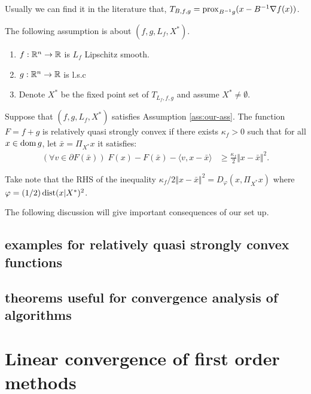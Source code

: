 \documentclass[12pt]{article}
\begin{document}
    \begin{remark}
        Usually we can find it in the literature that, $T_{B, f, g} = \operatorname{prox}_{B^{-1}g}(x - B^{-1}\nabla f(x))$. 
    \end{remark}

    \begin{assumption}\label{ass:our-ass}
        The following assumption is about $(f, g, L_f, X^*)$. 
        \begin{enumerate}
            \item $f: \mathbb R^n \rightarrow \mathbb R$ is $L_f$ Lipschitz smooth. 
            \item $g: \mathbb R^n \rightarrow \mathbb R$ is l.s.c
            \item Denote $X^*$ be the fixed point set of $T_{L_f, f, g}$ and assume $X^* \neq \emptyset$. 
        \end{enumerate}
    \end{assumption}
    \begin{definition}
        Suppose that $(f, g, L_f, X^*)$ satisfies Assumption \ref{ass:our-ass}. 
        The function $F = f + g$ is relatively quasi strongly convex if there exists $\kappa_f > 0$ such that for all $x \in \operatorname{dom} g$, let $\bar x = \Pi_{X^*}x$ it satisfies: 
        \begin{align*}
            \left(\forall v \in \partial F(\bar x)\right)\;
            F(x) - F(\bar x) - \langle v, x - \bar x\rangle 
            &\ge \frac{\kappa_f}{2}\Vert x - \bar x\Vert^2. 
        \end{align*}
    \end{definition}
    \begin{remark}
        Take note that the RHS of the inequality $\kappa_f/2 \Vert x - \bar x\Vert^2 = D_\varphi(x, \Pi_{X^*}x)$ where $\varphi = (1/2)\operatorname{dist}(x | X^*)^2$. 
    \end{remark}
    The following discussion will give important consequences of our set up. 
    \subsection{examples for relatively quasi strongly convex functions}

    \subsection{theorems useful for convergence analysis of algorithms}


\section{Linear convergence of first order methods}


    






\end{document}
